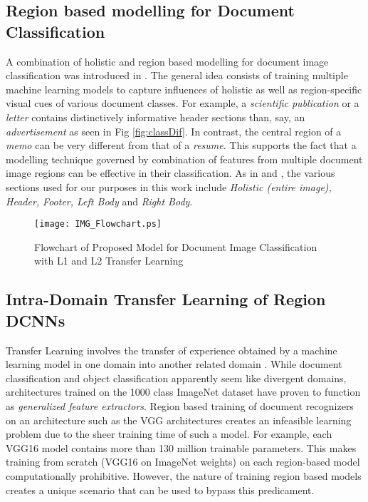 \documentclass[10pt,conference,a4paper]{IEEEtran}
\begin{document}
\subsection{Region based modelling for Document Classification}
A combination of holistic and region based modelling for document image classification was introduced in \cite{harley2015evaluation}. The general idea consists of training multiple machine learning models to capture influences of holistic as well as region-specific visual cues of various document classes. For example, a \textit{scientific publication} or a \textit{letter} contains distinctively informative header sections than, say, an \textit{advertisement} as seen in Fig \ref{fig:classDif}. In contrast, the central region of a \textit{memo} can be very different from that of a \textit{resume}. This supports the fact that a modelling technique governed by combination of features from multiple document image regions can be effective in their classification. As in \cite{harley2015evaluation} and \cite{roy2016generalized}, the various sections used for our purposes in this work include \textit{Holistic (entire image), Header, Footer, Left Body} and \textit{Right Body}.

\begin{figure}[t]
	\centering
	\texttt{[image: IMG\_Flowchart.ps]}
	\caption{Flowchart of Proposed Model for Document Image Classification with L1 and L2 Transfer Learning} \label{fig:flowchart}
\end{figure}

\subsection{Intra-Domain Transfer Learning of Region DCNNs}
Transfer Learning involves the transfer of experience obtained by a machine learning model in one domain into another related domain \cite{Pan2010}. While document classification and object classification apparently seem like divergent domains, architectures trained on the 1000 class ImageNet dataset have proven to function as \textit{generalized feature extractors}. Region based training of document recognizers on an architecture such as the VGG architectures creates an infeasible learning problem due to the sheer training time of such a model. For example, each VGG16 model contains more than 130 million trainable parameters. This makes training from scratch (VGG16 on ImageNet weights) on each region-based model computationally prohibitive. However, the nature of training region based models creates a unique scenario that can be used to bypass this predicament.
\end{document}
